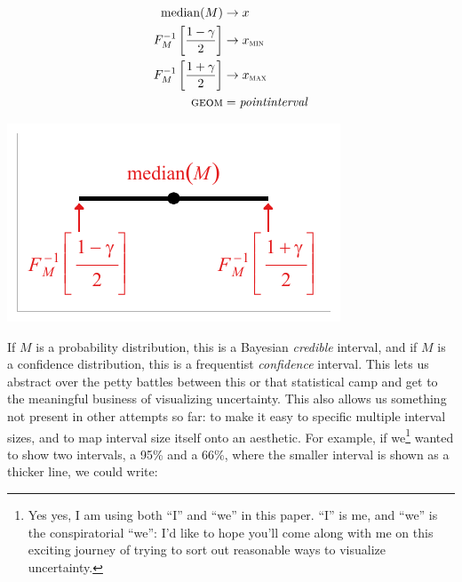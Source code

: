 \documentclass[journal]{vgtc}              %
\begin{document}
\noindent
\begin{minipage}{.5\columnwidth}
\begin{align*}
\operatorname{median}(M) &\rightarrow x\\
F_M^{-1}\left[\frac{1 - \gamma}{2}\right] &\rightarrow x_\textsc{min}\\
F_M^{-1}\left[\frac{1 + \gamma}{2}\right] &\rightarrow x_\textsc{max}\\
\textsc{geom} &= \mathit{pointinterval}
\end{align*}
\end{minipage}%
  \begin{minipage}{.4\columnwidth}
    \centering
    \includegraphics[width=1.2\columnwidth]{figs/3-geom_pointinterval_quantiles.pdf}
  \end{minipage}
\hfill\break

If $M$ is a probability distribution, this is a Bayesian \textit{credible }interval, and if $M$ is a confidence distribution, this is a frequentist \textit{confidence} interval. This lets us abstract over the petty battles between this or that statistical camp and get to the meaningful business of visualizing uncertainty. This also allows us something not present in other attempts so far: to make it easy to specific multiple interval sizes, and to map interval size itself onto an aesthetic. For example, if we\footnote{Yes yes, I am using both ``I'' and ``we'' in this paper. ``I'' is me, and ``we'' is the conspiratorial ``we'': I'd like to hope you'll come along with me on this exciting journey of trying to sort out reasonable ways to visualize uncertainty.} wanted to show two intervals, a 95\% and a 66\%, where the smaller interval is shown as a thicker line, we could write:
\end{document}
